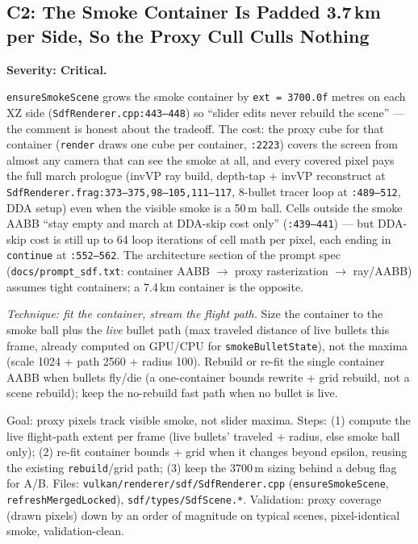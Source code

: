 \documentclass[11pt,a4paper]{article}
\begin{document}
\subsection{C2: The Smoke Container Is Padded 3.7\,km per Side, So the Proxy Cull Culls Nothing}
\label{sec:c2}

\textbf{Severity: Critical.}

\texttt{ensureSmokeScene} grows the smoke container by \texttt{ext = 3700.0f}
metres on each XZ side (\texttt{SdfRenderer.cpp:443--448}) so ``slider edits
never rebuild the scene'' --- the comment is honest about the tradeoff. The
cost: the proxy cube for that container (\texttt{render} draws one cube per
container, \texttt{:2223}) covers the screen from almost any camera that can
see the smoke at all, and every covered pixel pays the full march prologue
(invVP ray build, depth-tap + invVP reconstruct at
\texttt{SdfRenderer.frag:373--375,98--105,111--117}, 8-bullet tracer loop at
\texttt{:489--512}, DDA setup) even when the visible smoke is a 50\,m ball.
Cells outside the smoke AABB ``stay empty and march at DDA-skip cost only''
(\texttt{:439--441}) --- but DDA-skip cost is still up to 64 loop iterations
of cell math per pixel, each ending in \texttt{continue} at
\texttt{:552--562}. The architecture section of the prompt spec
(\texttt{docs/prompt\_sdf.txt}: container AABB $\rightarrow$ proxy
rasterization $\rightarrow$ ray/AABB) assumes tight containers; a 7.4\,km
container is the opposite.

\textit{Technique: fit the container, stream the flight path.} Size the
container to the smoke ball plus the \emph{live} bullet path (max traveled
distance of live bullets this frame, already computed on GPU/CPU for
\texttt{smokeBulletState}), not the maxima (scale 1024 + path 2560 + radius
100). Rebuild or re-fit the single container AABB when bullets fly/die (a
one-container bounds rewrite + grid rebuild, not a scene rebuild); keep the
no-rebuild fast path when no bullet is live.

\begin{tcolorbox}[promptbox={Prompt --- C2: tight smoke container}]
Goal: proxy pixels track visible smoke, not slider maxima. Steps: (1) compute
the live flight-path extent per frame (live bullets' traveled + radius, else
smoke ball only); (2) re-fit container bounds + grid when it changes beyond
epsilon, reusing the existing \texttt{rebuild}/grid path; (3) keep the 3700\,m
sizing behind a debug flag for A/B. Files:
\texttt{vulkan/renderer/sdf/SdfRenderer.cpp} (\texttt{ensureSmokeScene},
\texttt{refreshMergedLocked}), \texttt{sdf/types/SdfScene.*}.
Validation: proxy coverage (drawn pixels) down by an order of magnitude on
typical scenes, pixel-identical smoke, validation-clean.
\end{tcolorbox}
\end{document}
